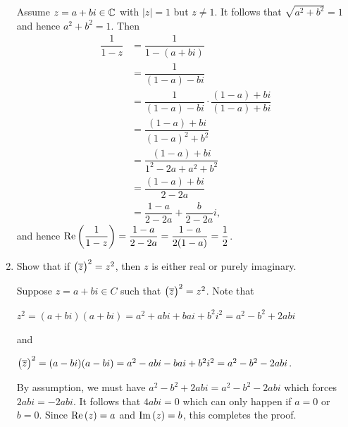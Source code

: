 \documentclass[11pt,fleqn,dvipsnames,usenames]{article}
\begin{document}
\begin{enumerate}
\solution Assume $z = a + bi\in\mathbb{C}$ with $|z| = 1$ but $z\neq 1$.  It follows that $\sqrt{a^2 + b^2} = 1$ and hence $a^{2}+b^{2} = 1$.  Then
\begin{align*}
\dfrac{1}{1-z} &= \dfrac{1}{1 - (a + bi)}\\
&= \dfrac{1}{(1 - a) - bi}\\
&= \dfrac{1}{(1 - a) - bi}\cdot\dfrac{(1 - a) + bi}{(1 - a) + bi}\\
&= \dfrac{(1 - a) + bi}{(1 - a)^2 + b^2}\\
&= \dfrac{(1 - a) + bi}{1^2 - 2a + a^2 + b^2}\\
&= \dfrac{(1 - a) + bi}{2 -2a}\\
&= \dfrac{1 - a}{2 - 2a} + \dfrac{b}{2 - 2a}i,
\end{align*}
and hence $\text{Re}\left(\dfrac{1}{1-z}\right) = \dfrac{1 - a}{2 - 2a} = \dfrac{1-a}{2(1-a)} = \dfrac{1}{2}$.

\item Show that if $\big(\overline{z}\big)^2 = z^2$, then $z$ is either real or purely imaginary.
\vsmsp

\solution Suppose $z = a + bi\in C$ such that $\big(\overline{z}\big)^2 = z^2$.  Note that
\begin{center}
$z^2 = (a + bi)(a + bi) = a^2 + abi + bai + b^2i^2 = a^2 - b^2 + 2abi$
\end{center}
and
\begin{center}
$\big(\overline{z}\big)^2 = (a - bi)(a - bi) = a^2 - abi - bai + b^2i^2 = a^2 - b^2 - 2abi$.
\end{center}
By assumption, we must have $a^2 - b^2 + 2abi = a^2 - b^2 - 2abi$ which forces $2abi = -2abi$.  It follows that $4abi = 0$ which can only happen if $a = 0$ or $b=0$.  Since $\text{Re}\left(z\right) = a$ and $\text{Im}\left(z\right) = b$, this completes the proof.
\newpage


\end{enumerate}
\end{document}
